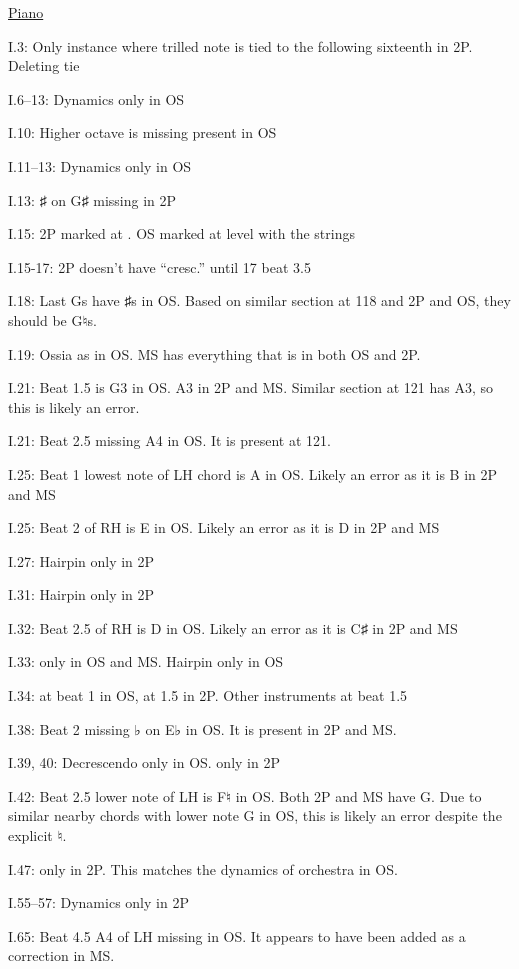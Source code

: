 \documentclass[twoside]{article}
\newcommand\dynmark[1]{\scalebox{0.9}{#1}{\kern1pt}}
\begin{document}
\begin{hangparas}{15pt}{1}
\begin{multicols}{2}
\underline{Piano}

I.3: Only instance where trilled note is tied to the following sixteenth in 2P. Deleting tie

I.6--13: Dynamics only in OS

I.10: Higher octave is missing present in OS

I.11--13: Dynamics only in OS

I.13: ♯ on G♯ missing in 2P

I.15: 2P marked at \dynmark{\pp}. OS marked at \dynmark{\p} level with the strings

I.15-17: 2P doesn't have ``cresc.'' until 17 beat 3.5

I.18: Last Gs have ♯s in OS. Based on similar section at 118 and 2P and OS, they should be G♮s.

I.19: Ossia as in OS. MS has everything that is in both OS and 2P.

I.21: Beat 1.5 is G3 in OS. A3 in 2P and MS. Similar section at 121 has A3, so this is likely an error.

I.21: Beat 2.5 missing A4 in OS. It is present at 121.

I.25: Beat 1 lowest note of LH chord is A in OS. Likely an error as it is B in 2P and MS

I.25: Beat 2 of RH is E in OS. Likely an error as it is D in 2P and MS

I.27: Hairpin only in 2P

I.31: Hairpin only in 2P

I.32: Beat 2.5 of RH is D in OS. Likely an error as it is C♯ in 2P and MS

I.33: \dynmark{\pp} only in OS and MS. Hairpin only in OS

I.34: \dynmark{\f} at beat 1 in OS, at 1.5 in 2P. Other instruments \dynmark{\f} at beat 1.5

I.38: Beat 2 missing ♭ on E♭ in OS. It is present in 2P and MS.

I.39, 40: Decrescendo only in OS. \dynmark{\pp} only in 2P

I.42: Beat 2.5 lower note of LH is F♮ in OS. Both 2P and MS have G. Due to similar nearby chords with lower note G in OS, this is likely an error despite the explicit ♮.

I.47: \dynmark{\p} only in 2P. This matches the dynamics of orchestra in OS.

I.55--57: Dynamics only in 2P

I.65: Beat 4.5 A4 of LH missing in OS. It appears to have been added as a correction in MS.


\end{multicols}
\end{hangparas}
\end{document}
